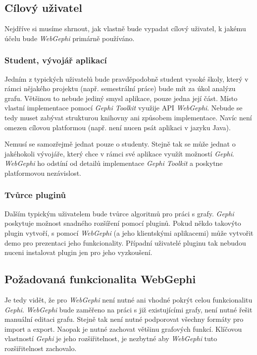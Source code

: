 \documentclass[thesis=M,czech]{FITthesis}[2014/05/6]
\begin{document}
\subsection{Cílový uživatel}
Nejdříve si musíme shrnout, jak vlastně bude vypadat cílový uživatel, k jakému účelu bude \textit{WebGephi} primárně používáno.

\subsubsection{Student, vývojář aplikací}
Jedním z typických uživatelů bude pravděpodobně student vysoké školy, který v rámci nějakého projektu (např. semestrální práce) bude 
mít za úkol analýzu grafu. Většinou to nebude jediný smysl aplikace, pouze jedna její část. Místo vlastní implementace pomocí \textit{Gephi Toolkit}
využije API \textit{WebGephi}. Nebude se tedy muset zabývat strukturou knihovny ani způsobem implementace. Navíc není omezen
cílovou platformou (např. není nucen psát aplikaci v jazyku Java).

Nemusí se samozřejmě jednat pouze o studenty. Stejně tak se může jednat o jakéhokoli vývojáře, který chce v rámci své aplikace
využít možností \textit{Gephi}. \textit{WebGephi} ho odstíní od detailů implementace \textit{Gephi Toolkit} a poskytne platformovou nezávislost.

\subsubsection{Tvůrce pluginů}
Dalším typickým uživatelem bude tvůrce algoritmů pro práci s grafy. \textit{Gephi} poskytuje možnost snadného rozšíření pomocí pluginů.
Pokud někdo takovýto plugin vytvoří, s pomocí \textit{WebGephi} (a jeho klientskými aplikacemi) může vytvořit demo pro prezentaci jeho funkcionality. Případní 
uživatelé pluginu tak nebudou nuceni instalovat plugin jen pro jeho vyzkoušení.

\subsection{Požadovaná funkcionalita WebGephi}
Je tedy vidět, že pro \textit{WebGephi} není nutné ani vhodné pokrýt celou funkcionalitu \textit{Gephi}.
\textit{WebGephi} bude zaměřeno na práci s již existujícími grafy, není nutné řešit manuální editaci grafu. Stejně tak není nutné
podporovat všechny formáty pro import a export. Naopak je nutné zachovat většinu graf\-ových funkcí. Klíčovou
vlastností \textit{Gephi} je jeho rozšiřitelnost, je nezbytné aby \textit{WebGephi} tuto rozšiřitelnost zachovalo.
\end{document}
